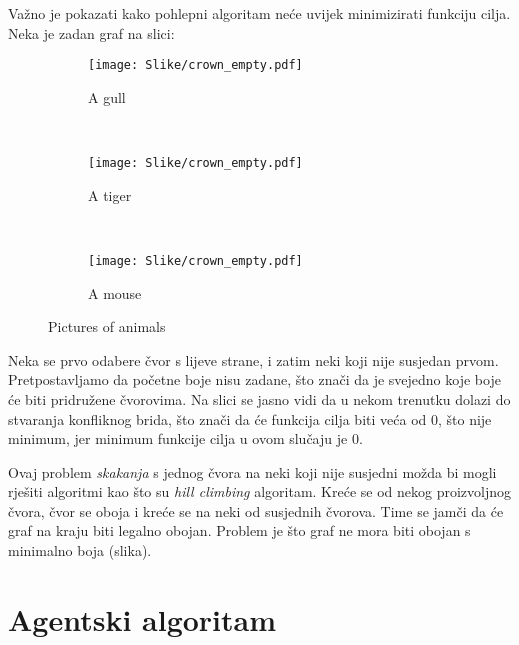\documentclass[times, utf8, diplomski, numeric]{fer}
\begin{document}
Važno je pokazati kako pohlepni algoritam neće uvijek minimizirati funkciju cilja. Neka je zadan graf na slici:

\begin{figure}
        \centering
        \begin{subfigure}[b]{0.3\textwidth}
                \texttt{[image: Slike/crown\_empty.pdf]}
                \caption{A gull}
                \label{fig:gull}
        \end{subfigure}%
        ~ %
        \begin{subfigure}[b]{0.3\textwidth}
                \texttt{[image: Slike/crown\_empty.pdf]}
                \caption{A tiger}
                \label{fig:tiger}
        \end{subfigure}
        ~ %
        \begin{subfigure}[b]{0.3\textwidth}
                \texttt{[image: Slike/crown\_empty.pdf]}
                \caption{A mouse}
                \label{fig:mouse}
        \end{subfigure}
        \caption{Pictures of animals}\label{fig:animals}
\end{figure}

Neka se prvo odabere čvor s lijeve strane, i zatim neki koji nije susjedan prvom. Pretpostavljamo da početne boje nisu zadane, što znači da je svejedno koje boje će biti pridružene čvorovima. Na slici se jasno vidi da u nekom trenutku dolazi do stvaranja konfliknog brida, što znači da će funkcija cilja biti veća od $0$, što nije minimum, jer minimum funkcije cilja u ovom slučaju je $0$.

Ovaj problem \emph{skakanja} s jednog čvora na neki koji nije susjedni možda bi mogli rješiti algoritmi kao što su \emph{hill climbing} algoritam. Kreće se od nekog proizvoljnog čvora, čvor se oboja i kreće se na neki od susjednih čvorova. Time se jamči da će graf na kraju biti legalno obojan. Problem je što graf ne mora biti obojan s minimalno boja (slika).

\section{Agentski algoritam}
\end{document}
